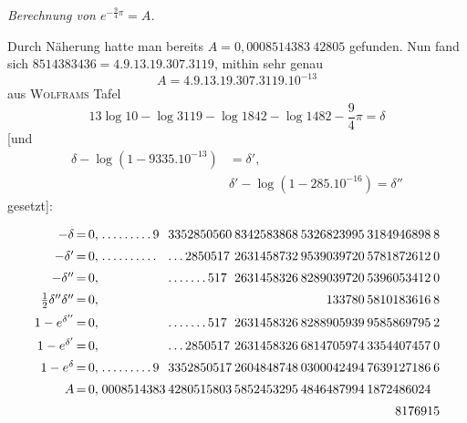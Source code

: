 \begingroup
\renewcommand{\arraystretch}{1.45}
\par{}

\begin{center}\emph{Berechnung von $e^{-\frac94\pi}=A$.}\end{center}

Durch Näherung hatte man bereits $A=0{,}0008514383\ 42805$ gefunden. Nun fand sich
$8514383436=4.9.13.19.307.3119$, mithin sehr genau
\[
A=4.9.13.19.307.3119.10^{-13}
\]
aus \textsc{Wolframs} Tafel
\[
13\log10-\log3119-\log1842-\log1482-\frac94\pi=\delta
\]
[und
\[
\begin{aligned}\delta-\log(1-9335.10^{-13})&=\delta',\\[7pt]&
\delta'-\log(1-285.10^{-16})=\delta''\end{aligned}
\]
gesetzt]:

\begingroup\footnotesize\setlength{\arraycolsep}{1pt}\renewcommand{\arraystretch}{1.12}\[
\begin{array}{r@{\,=\,}r@{\;}l@{\hspace{2pt}}l@{\hspace{2pt}}l@{\hspace{2pt}}l@{\hspace{2pt}}l@{\hspace{2pt}}l}
-\delta & 0{,} & .\,.\,.\,.\,.\,.\,.\,.\,.\,9 & 3352850560 & 8342583868 & 5326823995 & 3184946898 & 8\\[5pt]
-\delta' & 0{,} & .\,.\,.\,.\,.\,.\,.\,.\,.\,. & .\,.\,.\,2850517 & 2631458732 & 9539039720 & 5781872612 & 0\\[5pt]
-\delta'' & 0{,} &  & .\,.\,.\,.\,.\,.\,.\,517 & 2631458326 & 8289039720 & 5396053412 & 0\\[5pt]
\tfrac12\delta''\delta'' & 0{,} &  &  &  & \phantom{0000}133780 & 5810183616 & 8\\[5pt]
1-e^{\delta''} & 0{,} &  & .\,.\,.\,.\,.\,.\,.\,517 & 2631458326 & 8288905939 & 9585869795 & 2\\[5pt]
1-e^{\delta'} & 0{,} &  & .\,.\,.\,2850517 & 2631458326 & 6814705974 & 3354407457 & 0\\[5pt]
1-e^\delta & 0{,} & .\,.\,.\,.\,.\,.\,.\,.\,.\,9 & 3352850517 & 2604848748 & 0300042494 & 7639127186 & 6\\[5pt]
A & 0{,} & 0008514383 & 4280515803 & 5852453295 & 4846487994 & 1872486024 & \\[5pt]
\multicolumn{2}{c}{}&\multicolumn{6}{r}{8176915}\\[5pt]
\end{array}
\]\endgroup

